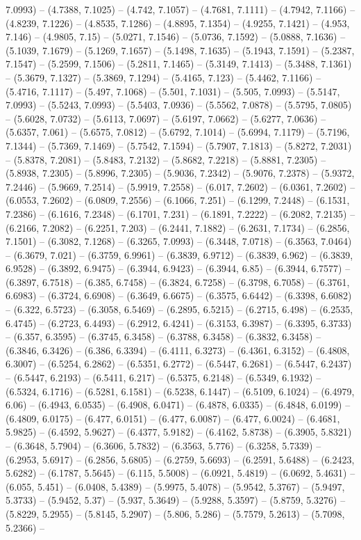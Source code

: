 7.0993) -- (4.7388, 7.1025) -- (4.742, 7.1057) -- (4.7681, 7.1111) -- (4.7942, 7.1166) -- (4.8239, 7.1226) -- (4.8535, 7.1286) -- (4.8895, 7.1354) -- (4.9255, 7.1421) -- (4.953, 7.146) -- (4.9805, 7.15) -- (5.0271, 7.1546) -- (5.0736, 7.1592) -- (5.0888, 7.1636) -- (5.1039, 7.1679) -- (5.1269, 7.1657) -- (5.1498, 7.1635) -- (5.1943, 7.1591) -- (5.2387, 7.1547) -- (5.2599, 7.1506) -- (5.2811, 7.1465) -- (5.3149, 7.1413) -- (5.3488, 7.1361) -- (5.3679, 7.1327) -- (5.3869, 7.1294) -- (5.4165, 7.123) -- (5.4462, 7.1166) -- (5.4716, 7.1117) -- (5.497, 7.1068) -- (5.501, 7.1031) -- (5.505, 7.0993) -- (5.5147, 7.0993) -- (5.5243, 7.0993) -- (5.5403, 7.0936) -- (5.5562, 7.0878) -- (5.5795, 7.0805) -- (5.6028, 7.0732) -- (5.6113, 7.0697) -- (5.6197, 7.0662) -- (5.6277, 7.0636) -- (5.6357, 7.061) -- (5.6575, 7.0812) -- (5.6792, 7.1014) -- (5.6994, 7.1179) -- (5.7196, 7.1344) -- (5.7369, 7.1469) -- (5.7542, 7.1594) -- (5.7907, 7.1813) -- (5.8272, 7.2031) -- (5.8378, 7.2081) -- (5.8483, 7.2132) -- (5.8682, 7.2218) -- (5.8881, 7.2305) -- (5.8938, 7.2305) -- (5.8996, 7.2305) -- (5.9036, 7.2342) -- (5.9076, 7.2378) -- (5.9372, 7.2446) -- (5.9669, 7.2514) -- (5.9919, 7.2558) -- (6.017, 7.2602) -- (6.0361, 7.2602) -- (6.0553, 7.2602) -- (6.0809, 7.2556) -- (6.1066, 7.251) -- (6.1299, 7.2448) -- (6.1531, 7.2386) -- (6.1616, 7.2348) -- (6.1701, 7.231) -- (6.1891, 7.2222) -- (6.2082, 7.2135) -- (6.2166, 7.2082) -- (6.2251, 7.203) -- (6.2441, 7.1882) -- (6.2631, 7.1734) -- (6.2856, 7.1501) -- (6.3082, 7.1268) -- (6.3265, 7.0993) -- (6.3448, 7.0718) -- (6.3563, 7.0464) -- (6.3679, 7.021) -- (6.3759, 6.9961) -- (6.3839, 6.9712) -- (6.3839, 6.962) -- (6.3839, 6.9528) -- (6.3892, 6.9475) -- (6.3944, 6.9423) -- (6.3944, 6.85) -- (6.3944, 6.7577) -- (6.3897, 6.7518) -- (6.385, 6.7458) -- (6.3824, 6.7258) -- (6.3798, 6.7058) -- (6.3761, 6.6983) -- (6.3724, 6.6908) -- (6.3649, 6.6675) -- (6.3575, 6.6442) -- (6.3398, 6.6082) -- (6.322, 6.5723) -- (6.3058, 6.5469) -- (6.2895, 6.5215) -- (6.2715, 6.498) -- (6.2535, 6.4745) -- (6.2723, 6.4493) -- (6.2912, 6.4241) -- (6.3153, 6.3987) -- (6.3395, 6.3733) -- (6.357, 6.3595) -- (6.3745, 6.3458) -- (6.3788, 6.3458) -- (6.3832, 6.3458) -- (6.3846, 6.3426) -- (6.386, 6.3394) -- (6.4111, 6.3273) -- (6.4361, 6.3152) -- (6.4808, 6.3007) -- (6.5254, 6.2862) -- (6.5351, 6.2772) -- (6.5447, 6.2681) -- (6.5447, 6.2437) -- (6.5447, 6.2193) -- (6.5411, 6.217) -- (6.5375, 6.2148) -- (6.5349, 6.1932) -- (6.5324, 6.1716) -- (6.5281, 6.1581) -- (6.5238, 6.1447) -- (6.5109, 6.1024) -- (6.4979, 6.06) -- (6.4943, 6.0535) -- (6.4908, 6.0471) -- (6.4878, 6.0335) -- (6.4848, 6.0199) -- (6.4809, 6.0175) -- (6.477, 6.0151) -- (6.477, 6.0087) -- (6.477, 6.0024) -- (6.4681, 5.9825) -- (6.4592, 5.9627) -- (6.4377, 5.9182) -- (6.4162, 5.8738) -- (6.3905, 5.8321) -- (6.3648, 5.7904) -- (6.3606, 5.7832) -- (6.3563, 5.776) -- (6.3258, 5.7339) -- (6.2953, 5.6917) -- (6.2856, 5.6805) -- (6.2759, 5.6693) -- (6.2591, 5.6488) -- (6.2423, 5.6282) -- (6.1787, 5.5645) -- (6.115, 5.5008) -- (6.0921, 5.4819) -- (6.0692, 5.4631) -- (6.055, 5.451) -- (6.0408, 5.4389) -- (5.9975, 5.4078) -- (5.9542, 5.3767) -- (5.9497, 5.3733) -- (5.9452, 5.37) -- (5.937, 5.3649) -- (5.9288, 5.3597) -- (5.8759, 5.3276) -- (5.8229, 5.2955) -- (5.8145, 5.2907) -- (5.806, 5.286) -- (5.7579, 5.2613) -- (5.7098, 5.2366) -- 